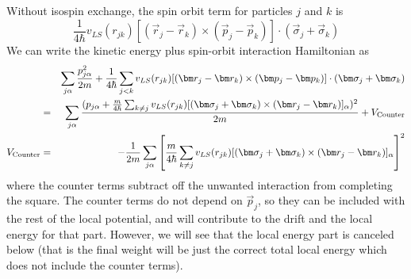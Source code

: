 Without isospin exchange, the spin orbit term for particles $j$ and $k$
is
\begin{equation}
\frac{1}{4\hbar}
v_{LS}(r_{jk}) [(\vec r_j-\vec r_k) \times (\vec p_j-\vec p_k)
]\cdot ( \vec\sigma_j+\vec \sigma_k )
\end{equation}
We can write the kinetic energy plus spin-orbit interaction Hamiltonian
as
\begin{eqnarray}
&& \sum_{j\alpha} \frac{p^2_{j\alpha}}{2m} +
\frac{1}{4\hbar}\sum_{j<k}
v_{LS}(r_{jk}) [(\vec r_j-\vec r_k) \times (\vec p_j-\vec p_k)
]\cdot ( \vec\sigma_j+\vec \sigma_k )
\nonumber\\
&=& \sum_{j\alpha} \frac{(p_{j\alpha}+\frac{m}{4\hbar}\sum_{k\neq j}
v_{LS}(r_{jk})
[(\vec \sigma_j+\vec \sigma_k) \times (\vec r_j-\vec r_k)]_\alpha)^2}{2m}
+V_{\rm Counter}
\nonumber\\
V_{\rm Counter} &=& -\frac{1}{2m} \sum_{j\alpha} \left [
\frac{m}{4\hbar}\sum_{k\neq j}
v_{LS}(r_{jk})
[(\vec \sigma_j+\vec \sigma_k) \times (\vec r_j-\vec r_k)]_\alpha \right ]^2
\end{eqnarray}
where the counter terms subtract off the unwanted interaction from
completing the square.
The counter terms do not depend on $\vec p_j$, so they can be included
with the rest of the local potential, and will contribute to the
drift and the local energy for that part. However, we will see that the local
energy part is canceled below (that is the final weight will be just the
correct total local energy which does not include the counter terms).

